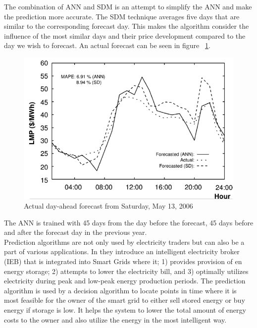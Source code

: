 The combination of ANN and SDM is an attempt to simplify the ANN and make the prediction more accurate. The SDM technique averages five days that are similar to the corresponding forecast day. This makes the algorithm consider the influence of the most similar days and their price development compared to the day we wish to forecast. An actual forecast can be seen in figure ~\ref{fig:actualForecastMay13}.
\begin{figure}[!ht]
\centering
\includegraphics[width=0.8\linewidth,natwidth=898,natheight=587]{billeder/SDMANNAccuracy.png}
\caption{Actual day-ahead forecast from Saturday, May 13, 2006 \cite{pjmForecast}}
\label{fig:actualForecastMay13}
\end{figure}
The ANN is trained with 45 days from the day before the forecast, 45 days before and after the forecast day in the previous year.
\\[0.5cm]
Prediction algorithms are not only used by electricity traders but can also be a part of various applications. In \cite{22} they introduce an intelligent electricity broker (IEB) that is integrated into Smart Grids where it; 1) provides provision of en energy storage; 2) attempts to lower the electricity bill, and 3) optimally utilizes electricity during peak and low-peak energy production periods. The prediction algorithm is used by a decision algorithm to locate points in time where it is most feasible for the owner of the smart grid to either sell stored energy or buy energy if storage is low. It helps the system to lower the total amount of energy costs to the owner and also utilize the energy in the most intelligent way.
 